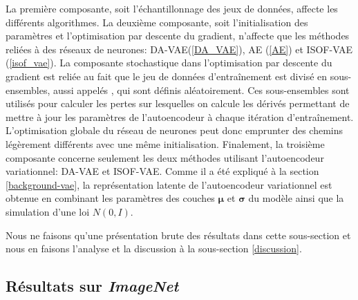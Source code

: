 La première composante, soit l'échantillonnage des jeux de données, affecte les \DIFdelbegin {}\DIFdelend \DIFaddbegin {}\DIFaddend différents algorithmes. La deuxième composante, soit l'initialisation des paramètres et l'optimisation par descente du gradient, n'affecte que les méthodes reliées à des réseaux de neurones: DA-VAE(\ref{DA_VAE}), AE (\ref{AE}) et ISOF-VAE (\ref{isof_vae}). La composante stochastique dans l'optimisation par descente du gradient est reliée au fait que le jeu de données d'entraînement est divisé en sous-ensembles, aussi appelés \DIFdelbegin {}\DIFdelend \DIFaddbegin {}\DIFaddend , qui sont définis aléatoirement. Ces sous-ensembles sont utilisés pour calculer les pertes sur lesquelles on calcule les dérivés permettant de mettre à jour les paramètres de l'autoencodeur à chaque itération d'entraînement. L'optimisation globale du réseau de neurones peut donc emprunter des chemins légèrement différents avec une même initialisation. Finalement, la troisième composante concerne seulement les deux méthodes utilisant l'autoencodeur variationnel: DA-VAE et ISOF-VAE. Comme il a été expliqué à la section \ref{background-vae}, la représentation latente de l'autoencodeur variationnel est obtenue en combinant les paramètres des couches $\boldsymbol{\mu}$ et $\boldsymbol{\sigma}$ du modèle ainsi que la simulation d'une loi $N(0,I)$.

Nous ne faisons qu'une présentation brute des résultats dans cette sous-section et nous en faisons l'analyse et la discussion à la sous-section \ref{discussion}.


\subsection{Résultats sur \textit{ImageNet}} \label{results:imagenet}

